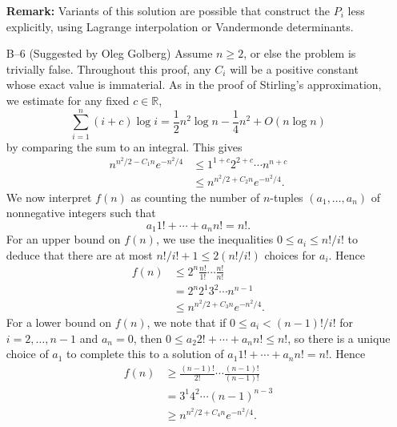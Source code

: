 \documentclass[amssymb,twocolumn,pra,10pt,aps]{revtex4-1}
\newcommand{\RR}{\mathbb{R}}
\begin{document}
\begin{itemize}
\textbf{Remark:} Variants of this solution are possible that
construct the $P_i$
less explicitly, using Lagrange interpolation or Vandermonde determinants.

\item[B--6]
(Suggested by Oleg Golberg)
Assume $n \geq 2$, or else the problem
is trivially false.
Throughout this proof, any $C_i$ will be a positive constant whose exact
value is immaterial.
As in the proof of Stirling's approximation, we
estimate for any fixed $c \in \RR$,
\[
\sum_{i=1}^n (i+c) \log i =
\frac{1}{2} n^2 \log n - \frac{1}{4} n^2 + O(n \log n)
\]
by comparing the sum to an integral. This gives
\begin{align*}
n^{n^2/2-C_1 n} e^{-n^2/4} &\leq 1^{1+c} 2^{2+c} \cdots n^{n+c} \\
&\leq n^{n^2/2+C_2 n} e^{-n^2/4}.
\end{align*}
We now interpret $f(n)$ as counting the number of $n$-tuples
$(a_1, \dots, a_n)$ of nonnegative integers such that
\[
a_1 1! + \cdots + a_n n! = n!.
\]
For an upper bound on $f(n)$, we use the inequalities
$0 \leq a_i \leq n!/i!$ to deduce that there are at most $n!/i! + 1 \leq 2(n!/i!)$
choices for $a_i$. Hence
\begin{align*}
f(n) &\leq 2^n \frac{n!}{1!} \cdots \frac{n!}{n!} \\
&= 2^n 2^1 3^2 \cdots n^{n-1} \\
&\leq n^{n^2/2+C_3 n} e^{-n^2/4}.
\end{align*}
For a lower bound on $f(n)$, we note that if $0 \leq a_i < (n-1)!/i!$
for $i=2,\dots,n-1$ and $a_n = 0$,
then $0 \leq a_2 2! + \cdots + a_n n! \leq n!$, so there is a unique
choice of $a_1$ to complete this to a solution of
$a_1 1! + \cdots + a_n n! = n!$. Hence
\begin{align*}
f(n) &\geq \frac{(n-1)!}{2!} \cdots \frac{(n-1)!}{(n-1)!} \\
&= 3^1 4^2 \cdots (n-1)^{n-3} \\
&\geq n^{n^2/2+C_4 n} e^{-n^2/4}.
\end{align*}

\end{itemize}
\end{document}
